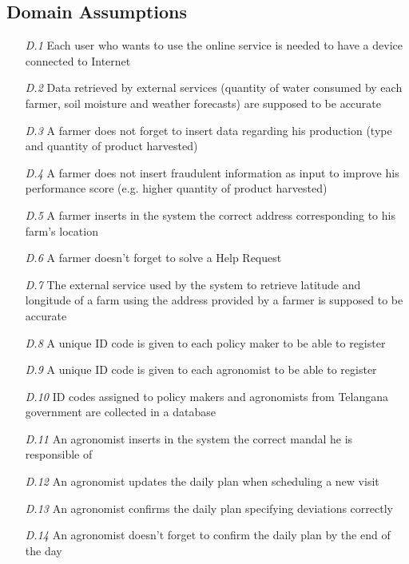 \subsection{Domain Assumptions}

\begin{itemize}
    \item [\textit{D.1}] Each user who wants to use the online service is needed to have a device connected to Internet 
    \item [\textit{D.2}] Data retrieved by external services (quantity of water consumed by each farmer, soil moisture and weather forecasts) are supposed to be accurate 
    \item [\textit{D.3}] A farmer does not forget to insert data regarding his production (type and quantity of product harvested)
    \item [\textit{D.4}] A farmer does not insert fraudulent information as input to  improve his performance score (e.g. higher quantity of product harvested)
    \item [\textit{D.5}] A farmer inserts in the system the correct address
    corresponding to his farm's location
    \item [\textit{D.6}] A farmer doesn't forget to solve a Help Request
    \item [\textit{D.7}]The external service used by the system to retrieve latitude and longitude of a farm using the address provided by a farmer is supposed to be accurate
    \item [\textit{D.8}] A unique ID code is given to each policy maker to be able to register
    \item [\textit{D.9}] A unique ID code is given to each agronomist to be able to register
    \item [\textit{D.10}] ID codes assigned to policy makers and agronomists from Telangana government are collected in a database
    \item [\textit{D.11}] An agronomist inserts in the system the correct mandal he is responsible of
    \item [\textit{D.12}] An agronomist updates the daily plan when scheduling a new visit
    \item [\textit{D.13}] An agronomist confirms the daily plan specifying deviations correctly 
    \item [\textit{D.14}] An agronomist doesn't forget to confirm the daily plan by the end of the day
\end{itemize}

